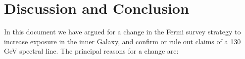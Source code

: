 \documentclass[aps,prd,superscriptaddress,nofootinbib,fixlfloat, 12pt]{revtex4-1}
\begin{document}

\section{Discussion and Conclusion}
\label{sec:Conclusion}

In this document we have argued for a change in the Fermi survey strategy to
increase exposure in the inner Galaxy, and confirm or rule out claims of a 130
GeV spectral line.  The principal reasons for a change are:
\end{document}
